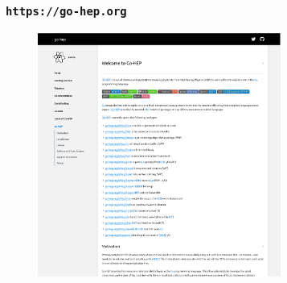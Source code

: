 \documentclass[9pt]{beamer}
\begin{document}
\begin{frame}[fragile]
	\frametitle{\texttt{https://go-hep.org}}


\begin{figure}[h]
\begin{center}
\includegraphics[width=8cm,height=8cm]{_figs/go-hep-home.png}
\end{center}

\end{figure}


\end{frame}
\end{document}
